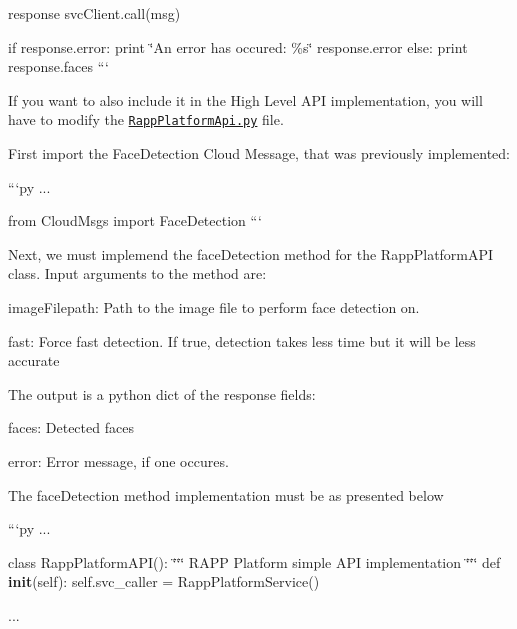response svc\-Client.\-call(msg)

if response.\-error\-: print \char`\"{}\-An error has occured\-: \%s\char`\"{} response.\-error else\-: print response.\-faces ```

If you want to also include it in the High Level A\-P\-I implementation, you will have to modify the \href{https://github.com/rapp-project/rapp-api/blob/master/python/RappCloud/RappPlatformApi.py}{\tt Rapp\-Platform\-Api.\-py} file.

First import the {\ttfamily Face\-Detection} Cloud Message, that was previously implemented\-:

```py ...

from Cloud\-Msgs import Face\-Detection ```

Next, we must implemend the {\ttfamily face\-Detection} method for the Rapp\-Platform\-A\-P\-I class. Input arguments to the method are\-:


\begin{DoxyItemize}
\item image\-Filepath\-: Path to the image file to perform face detection on.
\item fast\-: Force fast detection. If true, detection takes less time but it will be less accurate
\end{DoxyItemize}

The output is a python {\ttfamily dict} of the response fields\-:


\begin{DoxyItemize}
\item faces\-: Detected faces
\item error\-: Error message, if one occures.
\end{DoxyItemize}

The {\ttfamily face\-Detection} method implementation must be as presented below

```py ...

class Rapp\-Platform\-A\-P\-I()\-: \char`\"{}\char`\"{}\char`\"{} R\-A\-P\-P Platform simple A\-P\-I implementation \char`\"{}\char`\"{}\char`\"{} def {\bfseries init}(self)\-: self.\-svc\-\_\-caller = Rapp\-Platform\-Service()

...

